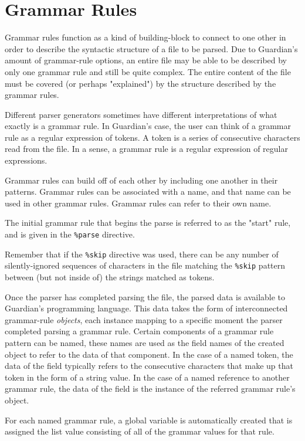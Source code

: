 

\section{Grammar Rules}
{
	Grammar rules function as a kind of building-block to connect to one
	other in order to describe the syntactic structure of a file to be parsed.
	Due to Guardian's amount of grammar-rule options, an entire file
	may be able to be described by only one grammar rule and still be quite
	complex.
	The entire content of the file must be covered (or perhaps "explained") by
	the structure described by the grammar rules.
	
	Different parser generators sometimes have different interpretations of
	what exactly is a grammar rule. In Guardian's case, the user can think
	of a grammar rule as a regular expression of tokens. A token is a series of
	consecutive characters read from the file.
	In a sense, a grammar rule is a regular expression of regular expressions.
	
	Grammar rules can build off of each other by including one another in their
	patterns.
	Grammar rules can be associated with a name, and that name can be used in
	other grammar rules. Grammar rules can refer to their own name.
	
	The initial grammar rule that begins the parse is referred to as the
	"start" rule, and is given in the \texttt{\%parse} directive.
	
	Remember that if the \texttt{\%skip} directive was used, there can be
	any number of silently-ignored sequences of characters in the file matching
	the \texttt{\%skip} pattern between
	(but not inside of) the strings matched as tokens.
	
	Once the parser has completed parsing the file, the parsed data is available
	to Guardian's programming language. This data takes the form of
	interconnected grammar-rule \textit{objects}, each instance mapping to a
	specific moment the parser completed parsing a grammar rule.
	Certain components of a grammar rule pattern can be named, these names
	are used as the field names of the created object to refer to the data of
	that component. In the case of a named token, the data of the field typically
	refers to the consecutive characters that make up that token in the form
	of a string value.
	In the case of a named reference to another grammar rule, the data of the
	field is the instance of the referred grammar rule's object.
	
	For each named grammar rule, a global variable is automatically created
	that is assigned the list value consisting of all of the grammar values
	for that rule.
	
}
